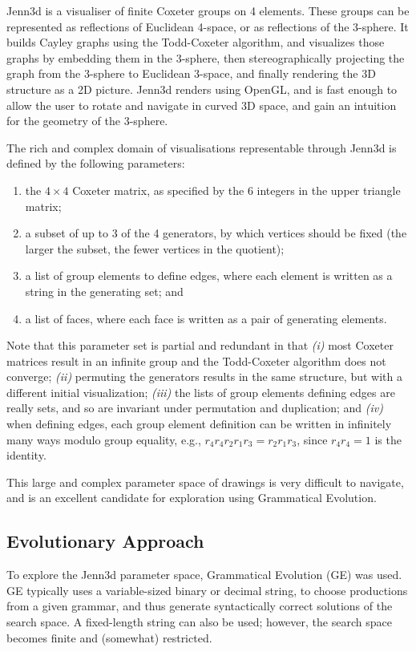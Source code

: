 \documentclass{article}
\begin{document}
Jenn3d is a visualiser of finite Coxeter groups on 4 elements.  These groups
can be represented as
reflections of Euclidean 4-space, or as reflections of the 3-sphere.  It
builds Cayley graphs using the Todd-Coxeter algorithm, and visualizes those graphs
by embedding them in the 3-sphere, then stereographically projecting the
graph from the 3-sphere to Euclidean 3-space, and finally rendering the 3D structure
as a 2D picture. Jenn3d renders using OpenGL, and is fast enough to allow the
user to rotate and navigate in curved 3D space, and gain an intuition for the
geometry of the 3-sphere.

The rich and complex domain of visualisations representable through Jenn3d is defined by the following parameters:
\begin{enumerate}
\item the $4\times 4$ Coxeter matrix, as specified by the 6 integers in the upper triangle matrix;
\item a subset of up to 3 of the 4 generators, by which vertices should be fixed
  (the larger the subset, the fewer vertices in the quotient);
\item a list of group elements to define edges,
  where each element is written as a string in the generating set; and
\item a list of faces, where each face is written as a pair of generating elements.
\end{enumerate}
Note that this parameter set is partial and redundant in that
\emph{(i)} most Coxeter matrices result in an infinite group
and the Todd-Coxeter algorithm does not converge;
\emph{(ii)} permuting the generators results in the same structure,
but with a different initial visualization;
\emph{(iii)} the lists of group elements defining edges are really sets,
and so are invariant under permutation and duplication; and
\emph{(iv)} when defining edges, each group element definition can be written
in infinitely many ways modulo group equality, e.g.,
$r_4r_4r_2r_1r_3=r_2r_1r_3$, since $r_4r_4=1$ is the identity.

This large and complex parameter space of drawings is very difficult to
navigate, and is an excellent candidate for exploration using Grammatical
Evolution.

\subsection{Evolutionary Approach}

To explore the Jenn3d parameter space, Grammatical Evolution (GE)
\cite{oneill03b} was used. GE typically uses a variable-sized binary or decimal
string, to choose productions from a given grammar, and thus generate
syntactically correct solutions of the search space. A fixed-length string can
also be used; however, the search space becomes finite and (somewhat)
restricted.
\end{document}

